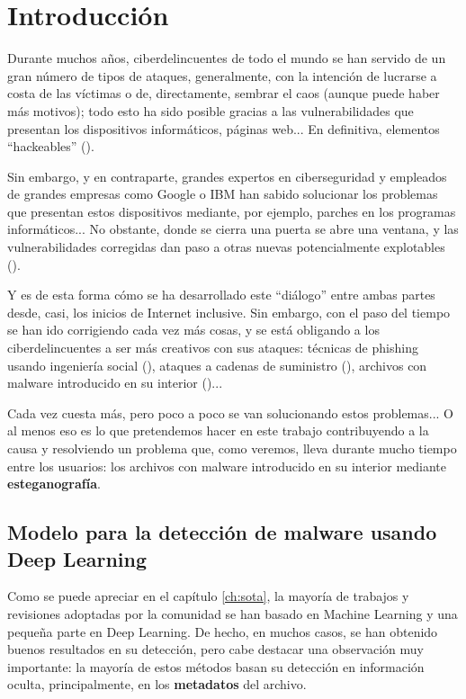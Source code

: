 \chapter{Introducción}
\label{ch:intro}

Durante muchos años, ciberdelincuentes de todo el mundo se han servido de un gran número de tipos de ataques, generalmente, con la intención de lucrarse a costa de las víctimas o de, directamente, sembrar el caos (aunque puede haber más motivos); todo esto ha sido posible gracias a las vulnerabilidades que presentan los dispositivos informáticos, páginas web... En definitiva, elementos ``hackeables'' (\cite{historia-ciber}).%

Sin embargo, y en contraparte, grandes expertos en ciberseguridad y empleados de grandes empresas como Google o IBM han sabido solucionar los problemas que presentan estos dispositivos mediante, por ejemplo, parches en los programas informáticos... No obstante, donde se cierra una puerta se abre una ventana, y las vulnerabilidades corregidas dan paso a otras nuevas potencialmente explotables (\cite{guerra-ciber}).%

Y es de esta forma cómo se ha desarrollado este ``diálogo'' entre ambas partes desde, casi, los inicios de Internet inclusive. Sin embargo, con el paso del tiempo se han ido corrigiendo cada vez más cosas, y se está obligando a los ciberdelincuentes a ser más creativos con sus ataques: técnicas de phishing usando ingeniería social (\cite{phishing}), ataques a cadenas de suministro (\cite{cadena-suministro}), archivos con malware introducido en su interior (\cite{malware})... %

Cada vez cuesta más, pero poco a poco se van solucionando estos problemas... O al menos eso es lo que pretendemos hacer en este trabajo contribuyendo a la causa y resolviendo un problema que, como veremos, lleva durante mucho tiempo entre los usuarios: los archivos con malware introducido en su interior mediante \textbf{esteganografía}.

\section{Modelo para la detección de malware usando Deep Learning}

Como se puede apreciar en el capítulo \ref{ch:sota}, la mayoría de trabajos y revisiones adoptadas por la comunidad se han basado en Machine Learning y una pequeña parte en Deep Learning. De hecho, en muchos casos, se han obtenido buenos resultados en su detección, pero cabe destacar una observación muy importante: la mayoría de estos métodos basan su detección en información oculta, principalmente, en los \textbf{metadatos} del archivo.

